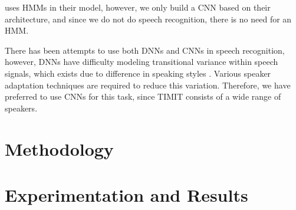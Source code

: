 \documentclass[a4paper,12pt]{report}
\begin{document}
\cite{sainath2013deep} uses HMMs in their model, however, we only build a CNN based on their architecture, and since we do not do speech recognition, there is no need for an HMM.

There has been attempts to use both DNNs and CNNs in speech recognition, however, DNNs have difficulty modeling transitional variance within speech signals, which exists due to difference in speaking styles \cite{lecun1995convolutional}. Various speaker adaptation techniques are required to reduce this variation. Therefore, we have preferred to use CNNs for this task, since TIMIT consists of a wide range of speakers.

\chapter{Methodology}

\chapter{Experimentation and Results}




\end{document}
